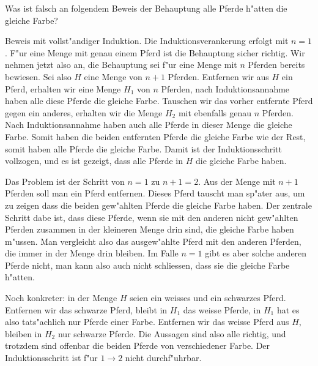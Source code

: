 Was ist falsch an folgendem Beweis der Behauptung alle Pferde h"atten die
gleiche Farbe?

Beweis mit vollst"andiger Induktion. Die Induktionsverankerung
erfolgt mit $n=1$. F"ur eine Menge mit genau einem Pferd ist
die Behauptung sicher richtig. Wir nehmen jetzt also an, die
Behauptung sei f"ur eine Menge mit $n$ Pferden bereits bewiesen.
Sei also $H$ eine Menge von $n+1$ Pferden. Entfernen wir aus $H$
ein Pferd, erhalten wir eine Menge $H_1$ von $n$ Pferden, nach
Induktionsannahme haben alle diese Pferde die gleiche Farbe.
Tauschen wir das vorher entfernte Pferd gegen ein anderes, erhalten
wir die Menge $H_2$ mit ebenfalls genau $n$ Pferden. Nach Induktionsannahme
haben auch alle Pferde in dieser Menge die gleiche Farbe. Somit
haben die beiden entfernten Pferde die gleiche Farbe wie der Rest,
somit haben alle Pferde die gleiche Farbe. Damit ist der Induktionsschritt
vollzogen, und es ist gezeigt, dass alle Pferde in $H$ die gleiche Farbe
haben.

\begin{loesung}
Das Problem ist der Schritt von $n=1$ zu $n+1=2$.
Aus der Menge mit $n+1$ Pferden soll man ein Pferd entfernen.
Dieses Pferd tauscht man sp"ater aus, um zu zeigen dass die
beiden gew"ahlten Pferde die gleiche Farbe haben. Der zentrale
Schritt dabe ist, dass diese Pferde, wenn sie mit den anderen nicht
gew"ahlten Pferden zusammen in der kleineren Menge drin sind,
die gleiche Farbe haben m"ussen. Man vergleicht also das ausgew"ahlte
Pferd mit den anderen Pferden, die immer in der Menge drin bleiben.
Im Falle $n=1$ gibt es aber solche
anderen Pferde nicht, man kann also auch nicht schliessen, dass
sie die gleiche Farbe h"atten.

Noch konkreter: in der Menge $H$ seien ein weisses und ein schwarzes Pferd.
Entfernen wir das schwarze Pferd, bleibt in $H_1$ das weisse Pferde,
in $H_1$ hat es also tats"achlich nur Pferde einer Farbe. Entfernen
wir das weisse Pferd aus $H$, bleiben in $H_2$ nur schwarze
Pferde. Die Aussagen sind also alle richtig, und trotzdem sind
offenbar die beiden Pferde von verschiedener Farbe. Der Induktionsschritt
ist f"ur $1\to 2$ nicht durchf"uhrbar.
\end{loesung}
